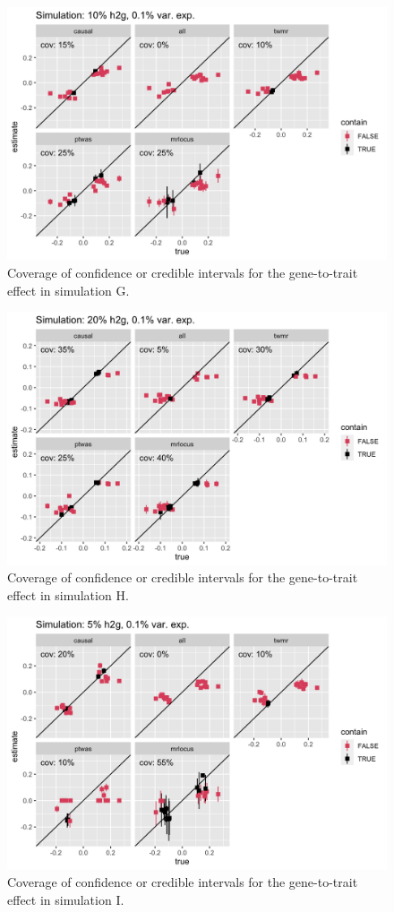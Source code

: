 \documentclass[11pt]{article}
\begin{document}
\begin{figure}[!ht]
  \centering
  \includegraphics[width=.8\textwidth]{figs/cover5.png}
  \caption{Coverage of confidence or credible intervals for the
    gene-to-trait effect in simulation G.}
\end{figure}

\begin{figure}[!ht]
  \centering
  \includegraphics[width=.8\textwidth]{figs/cover7.png}
  \caption{Coverage of confidence or credible intervals for the
    gene-to-trait effect in simulation H.}
\end{figure}

\begin{figure}[!ht]
  \centering
  \includegraphics[width=.8\textwidth]{figs/cover9.png}
  \caption{Coverage of confidence or credible intervals for the
    gene-to-trait effect in simulation I.}
\end{figure}
\end{document}
